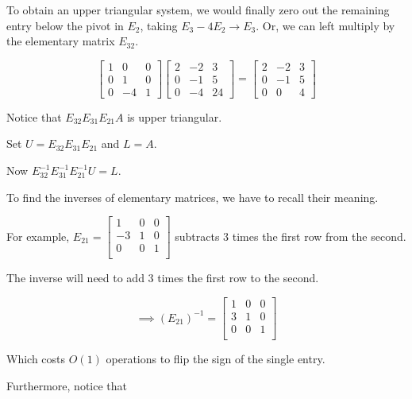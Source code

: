 To obtain an upper triangular system, we would finally zero out the remaining
entry below the pivot in $E_2$, taking $E_3-4E_2 \to E_3$. Or, we can left
multiply by the elementary matrix $E_{32}$.

\begin{equation*}
  \begin{bmatrix}
    1 & 0 & 0 \\
    0 & 1 & 0 \\
    0 & -4 & 1
  \end{bmatrix}
  \begin{bmatrix}
    2 & -2 & 3 \\
    0 & -1 & 5 \\
    0 & -4 & 24
  \end{bmatrix}
  =
  \begin{bmatrix}
    2 & -2 & 3 \\
    0 & -1 & 5 \\
    0 & 0 & 4
  \end{bmatrix}
\end{equation*}

Notice that $E_{32}E_{31}E_{21}A$ is upper triangular.

Set $U=E_{32}E_{31}E_{21}$ and $L=A$.

Now $E_{32}^{-1}E_{31}^{-1}E_{21}^{-1}U=L$.

To find the inverses of elementary matrices, we have to recall their meaning.

For example, $E_{21} = \begin{bmatrix}
1 & 0 & 0\\
-3 & 1 & 0\\
0 & 0 & 1\\
\end{bmatrix}$ subtracts $3$ times the first row from the second.

The inverse will need to add 3 times the first row to the second.

\begin{equation*}
  \implies (E_{21})^{-1} = \begin{bmatrix}
    1 & 0 & 0\\
    3 & 1 & 0\\
    0 & 0 & 1\\
  \end{bmatrix}
\end{equation*}

Which costs $O(1)$ operations to flip the sign of the single entry.

Furthermore, notice that 

